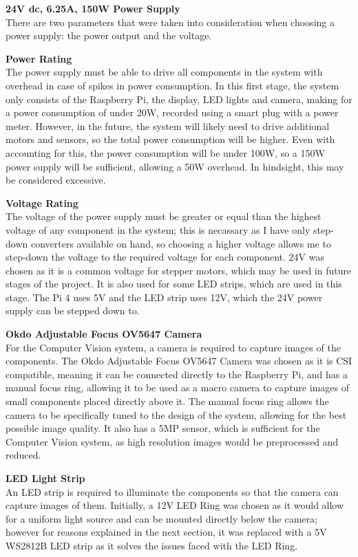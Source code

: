 \vspace{1em}
\noindent
\textbf{24V dc, 6.25A, 150W Power Supply} \\
There are two parameters that were taken into consideration when choosing a power supply: the power output and the voltage.
\begin{mylist}
  \item \textbf{Power Rating} \\
  The power supply must be able to drive all components in the system with overhead in case of spikes in power consumption.
  In this first stage, the system only consists of the Raspberry Pi, the display, LED lights and camera, 
  making for a power consumption of under 20W, recorded using a smart plug with a power meter.
  However, in the future, the system will likely need to drive additional motors and sensors, so the total power consumption
  will be higher. Even with accounting for this, the power consumption will be under 100W, so a 150W power supply will be sufficient,
  allowing a 50W overhead. In hindsight, this may be considered excessive.
  \item \textbf{Voltage Rating} \\
  The voltage of the power supply must be greater or equal than the highest voltage of any component in the system; this is necassary
  as I have only step-down converters available on hand, so choosing a higher voltage allows me to step-down the voltage 
  to the required voltage for each component. 24V was chosen as it is a common voltage for stepper motors, which may be used in
  future stages of the project. It is also used for some LED strips, which are used in this stage. The Pi 4 uses 5V and the LED strip
  uses 12V, which the 24V power supply can be stepped down to.
\end{mylist}

\noindent
\textbf{Okdo Adjustable Focus OV5647 Camera} \\
For the Computer Vision system, a camera is required to capture images of the components. The Okdo Adjustable Focus OV5647 Camera
was chosen as it is CSI compatible, meaning it can be connected directly to the Raspberry Pi, and has a manual focus ring, allowing
it to be used as a macro camera to capture images of small components placed directly above it. The manual focus ring allows the camera
to be specifically tuned to the design of the system, allowing for the best possible image quality. It also
has a 5MP sensor\cite{okdospec}, which is sufficient for the Computer Vision system, as high resolution images would be preprocessed and reduced.

\vspace{1em}
\noindent
\textbf{LED Light Strip} \\
An LED strip is required to illuminate the components so that the camera can capture images of them.
Initially, a 12V LED Ring was chosen as it would allow for a uniform light source and can be mounted directly below the camera; 
however for reasons explained in the next section, it was replaced with a 5V WS2812B LED strip as it solves the issues
faced with the LED Ring.
